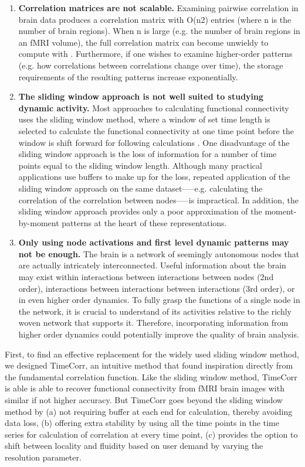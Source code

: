 \documentclass[12pt]{article}
\begin{document}
\begin{enumerate}
\item	\textbf{Correlation matrices are not scalable.} Examining pairwise correlation in brain data
produces a correlation matrix with O(n2) entries (where n is the number of brain regions). When n is large (e.g. the number of brain regions in an fMRI volume), the full correlation matrix can become unwieldy to compute with \cite{Rubinov2010}\cite{Betzel2017}\cite{Craddock2012}\cite{Yeo2011}. Furthermore, if one wishes to examine higher-order patterns (e.g. how correlations between correlations change over time), the storage requirements of the resulting patterns increase exponentially.

\item \textbf{The sliding window approach is not well suited to studying dynamic activity.} Most approaches to calculating functional connectivity uses the sliding window method, where a window of set time length is selected to calculate the functional connectivity at one time point before the window is shift forward for following calculations \cite{enrico2011}\cite{elena2012}. One disadvantage of the sliding window approach is the loss of information for a number of time points equal to the sliding window length. Although many practical applications use buffers to make up for the loss, repeated application of the sliding window approach on the same dataset—--e.g. calculating the correlation of the correlation between nodes—--is impractical. In addition, the sliding window approach provides only a poor approximation of the moment-by-moment patterns at the heart of these representations.

\item \textbf{Only using node activations and first level dynamic patterns may not be enough.} The brain is a network of seemingly autonomous nodes that are actually intricately interconnected. Useful information about the brain may exist within interactions between interactions between nodes (2nd order), interactions between interactions between interactions (3rd order), or in even higher order dynamics. To fully grasp the functions of a single node in the network, it is crucial to understand of its activities relative to the richly woven network that supports it. Therefore, incorporating information from higher order dynamics could potentially improve the quality of brain analysis.

\end{enumerate}

First, to find an effective replacement for the widely used sliding window method, we designed TimeCorr, an intuitive method that found inspiration directly from the fundamental correlation function. Like the sliding window method, TimeCorr is able is able to recover functional connectivity from fMRI brain images with similar if not higher accuracy. But TimeCorr goes beyond the sliding window method by (a) not requiring buffer at each end for calculation, thereby avoiding data loss, (b) offering extra stability by using all the time points in the time series for calculation of correlation at every time point, (c) provides the option to shift between locality and fluidity based on user demand by varying the resolution parameter.
\end{document}
